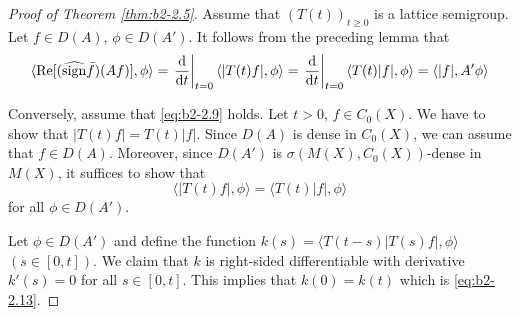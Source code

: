 \begin{proof}[Proof of Theorem \ref{thm:b2-2.5}]
Assume that $(T(t))_{t \geq 0}$ is a lattice semigroup.
Let $f \in D(A)$, $\phi \in D(A')$.
It follows from the preceding lemma that
\[
\langle \Re[(\widehat{\sign} \bar{f})(Af)],\phi \rangle %
= \left.\frac{\diff{}}{\dt}\right|_{t=0} \langle |T(t)f|,\phi \rangle = \left.\frac{\diff{}}{\dt}\right|_{t=0} \langle T(t)|f|,\phi \rangle 
= \langle |f|,A'\phi \rangle
\]

Conversely, assume that \eqref{eq:b2-2.9} holds.
Let $t > 0$, $f \in C_{0}(X)$.
We have to show that $|T(t)f| = T(t)|f|$.
Since $D(A)$ is dense in $C_{0}(X)$, we can assume that $f \in D(A)$.
Moreover, since $D(A')$ is $\sigma(M(X),C_{0}(X))$-dense in $M(X)$, it suffices to show that
\begin{equation}\label{eq:b2-2.13}
\langle |T(t)f|,\phi \rangle = \langle T(t)|f|,\phi \rangle
\end{equation}
for all $\phi \in D(A')$.

Let $\phi \in D(A')$ and define the function $k(s) = \langle T(t-s)|T(s)f|,\phi \rangle$ $(s \in [0,t])$.
We claim that $k$ is right-sided differentiable with derivative $k'(s) = 0$ for all $s \in [0,t]$.
This implies that $k(0) = k(t)$ which is \eqref{eq:b2-2.13}.


\end{proof}
